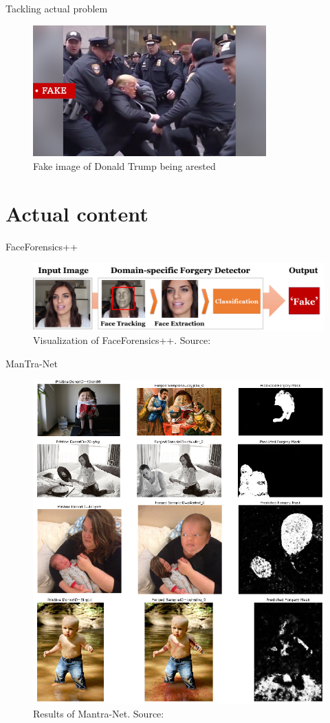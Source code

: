 \documentclass[xcolor=table]{beamer}
\begin{document}
\begin{frame}[containsverbatim]{Tackling actual problem}
    \begin{figure}
        \centering
        \includegraphics[width=0.8\textwidth]{img/trump.png}
        \caption{Fake image of Donald Trump being arested}
    \end{figure}
\end{frame}
\section{Actual content}

\begin{frame}[containsverbatim]{FaceForensics++}
    \begin{figure}
    \includegraphics[width=\linewidth]{img/FF++detection_pipeline.png}
    \caption{ Visualization of FaceForensics++.
  Source: \cite{rossler2019faceforensics++}}
    \label{img:FFPileline}
    \end{figure}
\end{frame}


\begin{frame}[containsverbatim]{ManTra-Net}
    \begin{figure}
    \includegraphics[width=0.5\linewidth]{img/mantra-net-example.png}
        \caption{Results of  Mantra-Net.  Source: \cite{ManTraNet}}
    \label{img:mantra-net}
    \end{figure}
\end{frame}
\end{document}

